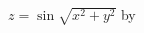 \documentclass[dvipdfmx,papersize]{jsarticle}
\begin{document}
\hspace{-4mm}
$z=\sin\sqrt{x^2+y^2}$ by \ketcindy
\vspace{5mm}

\begin{layerv}[22]{5}{0}
\end{layerv}
\end{document}
